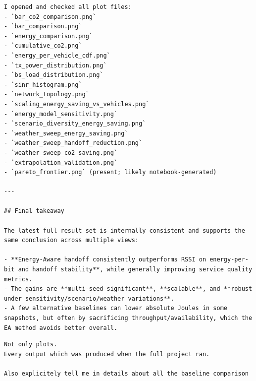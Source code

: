 \documentclass[11pt,a4paper]{article}
\newenvironment{userbox}
  {\begin{tcolorbox}[
    breakable,
    colback=UserBG,
    colframe=UserBorder,
    title=Source Request Extract,
    fonttitle=\bfseries\small\color{white},
    coltitle=white,
    colbacktitle=UserBorder,
    boxrule=0.5pt,
    arc=1.2mm,
    left=1.4mm,right=1.4mm,top=0.8mm,bottom=0.8mm,
    boxsep=0.6mm,
    before skip=0pt,
    after skip=0pt
  ]}
  {\end{tcolorbox}}
\newenvironment{assistantbox}
  {\begin{tcolorbox}[
    breakable,
    colback=AsstBG,
    colframe=AsstBorder,
    title=Project Overview Extract,
    fonttitle=\bfseries\small\color{white},
    coltitle=white,
    colbacktitle=AsstBorder,
    boxrule=0.5pt,
    arc=1.2mm,
    left=1.4mm,right=1.4mm,top=0.8mm,bottom=0.8mm,
    boxsep=0.6mm,
    before skip=0pt,
    after skip=0pt
  ]}
  {\end{tcolorbox}}
\begin{document}
\begin{assistantbox}
\begin{Verbatim}[breaklines=true,breakanywhere=true]
I opened and checked all plot files:
- `bar_co2_comparison.png`
- `bar_comparison.png`
- `energy_comparison.png`
- `cumulative_co2.png`
- `energy_per_vehicle_cdf.png`
- `tx_power_distribution.png`
- `bs_load_distribution.png`
- `sinr_histogram.png`
- `network_topology.png`
- `scaling_energy_saving_vs_vehicles.png`
- `energy_model_sensitivity.png`
- `scenario_diversity_energy_saving.png`
- `weather_sweep_energy_saving.png`
- `weather_sweep_handoff_reduction.png`
- `weather_sweep_co2_saving.png`
- `extrapolation_validation.png`
- `pareto_frontier.png` (present; likely notebook-generated)

---

## Final takeaway

The latest full result set is internally consistent and supports the same conclusion across multiple views:

- **Energy-Aware handoff consistently outperforms RSSI on energy-per-bit and handoff stability**, while generally improving service quality metrics.
- The gains are **multi-seed significant**, **scalable**, and **robust under sensitivity/scenario/weather variations**.
- A few alternative baselines can lower absolute Joules in some snapshots, but often by sacrificing throughput/availability, which the EA method avoids better overall.
\end{Verbatim}
\end{assistantbox}

\begin{userbox}
\begin{Verbatim}[breaklines=true,breakanywhere=true]
Not only plots.
Every output which was produced when the full project ran.

Also explicitely tell me in details about all the baseline comparison
\end{Verbatim}
\end{userbox}
\end{document}
